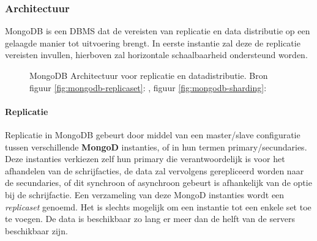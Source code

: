 \subsubsection{Architectuur}
MongoDB is een DBMS dat de vereisten van replicatie en data distributie op een gelaagde manier tot uitvoering brengt. In eerste instantie zal deze de replicatie vereisten invullen, hierboven zal horizontale schaalbaarheid ondersteund worden. 

\begin{figure}[ht!] 
\centering
	\hfill
	\caption{MongoDB Architectuur voor replicatie en datadistributie. Bron figuur \ref{fig:mongodb-replicaset}: \cite{mongodb-replicaset}, figuur \ref{fig:mongodb-sharding}: \cite{mongodb-shard}}
	\label{fig:mongodb-architectuur}
\end{figure}

\paragraph{Replicatie\cite{mongodb-replicaset}} Replicatie in MongoDB gebeurt door middel van een master/slave configuratie tussen verschillende \textbf{MongoD} instanties, of in hun termen primary/secundaries. Deze instanties verkiezen zelf hun primary die verantwoordelijk is voor het afhandelen van de schrijfacties, de data zal vervolgens gerepliceerd worden naar de secundaries, of dit synchroon of asynchroon gebeurt is afhankelijk van de optie bij de schrijfactie. Een verzameling van deze MongoD instanties wordt een \textit{replicaset} genoemd. Het is slechts mogelijk om een instantie tot een enkele set toe te voegen. De data is beschikbaar zo lang er meer dan de helft van de servers beschikbaar zijn. 

